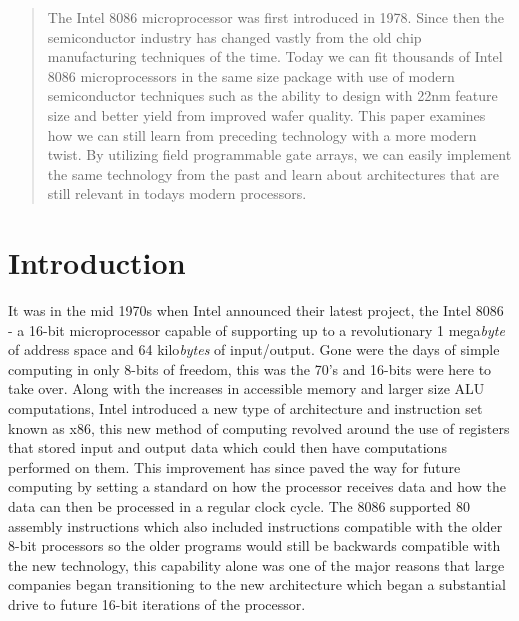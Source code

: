\documentclass[pdftex,10.5pt]{report}
\begin{document}


\begin{abstract}
The Intel 8086 microprocessor was first introduced in 1978. Since then the semiconductor industry has changed vastly from the old chip manufacturing techniques of the time. Today we can fit thousands of Intel 8086 microprocessors in the same size package with use of modern semiconductor techniques such as the ability to design with 22nm feature size and better yield from improved wafer quality. This paper examines how we can still learn from preceding technology with a more modern twist. By utilizing field programmable gate arrays, we can easily implement the same technology from the past and learn about architectures that are still relevant in todays modern processors.
\end{abstract}

\tableofcontents

\section{Introduction}
It was in the mid 1970s when Intel announced their latest project, the Intel 8086 -  a 16-bit microprocessor capable of supporting up to a revolutionary 1 mega{\em byte} of address space and 64 kilo{\em bytes} of input/output. Gone were the days of simple computing in only 8-bits of freedom, this was the 70's and 16-bits were here to take over. Along with the increases in accessible memory and larger size ALU computations, Intel introduced a new type of architecture and instruction set known as x86, this new method of computing revolved around the use of registers that stored input and output data which could then have computations performed on them. This improvement has since paved the way for future computing by setting a standard on how the processor receives data and how the data can then be processed in a regular clock cycle. The 8086 supported 80 assembly instructions which also included instructions compatible with the older 8-bit processors so the older programs would still be backwards compatible with the new technology, this capability alone was one of the major reasons that large companies began transitioning to the new architecture which began a substantial drive to future 16-bit iterations of the processor.
\end{document}
